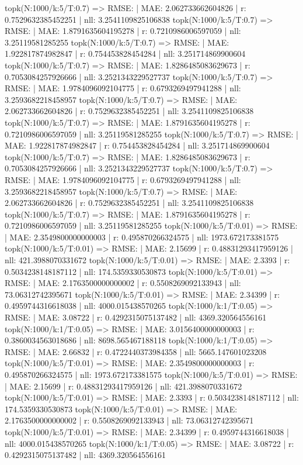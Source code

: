topk(N:1000/k:5/T:0.7) => RMSE: | MAE: 2.062733662604826 | r: 0.7529632385452251 | nll: 3.2541109825106838
topk(N:1000/k:5/T:0.7) => RMSE: | MAE: 1.8791635604195278 | r: 0.7210986006597059 | nll: 3.25119581285255
topk(N:1000/k:5/T:0.7) => RMSE: | MAE: 1.922817874982847 | r: 0.754453828454284 | nll: 3.251714869900604
topk(N:1000/k:5/T:0.7) => RMSE: | MAE: 1.8286485083629673 | r: 0.7053084257926666 | nll: 3.2521343229527737
topk(N:1000/k:5/T:0.7) => RMSE: | MAE: 1.9784096092104775 | r: 0.6793269497941288 | nll: 3.2593682218458957
topk(N:1000/k:5/T:0.7) => RMSE: | MAE: 2.062733662604826 | r: 0.7529632385452251 | nll: 3.2541109825106838
topk(N:1000/k:5/T:0.7) => RMSE: | MAE: 1.8791635604195278 | r: 0.7210986006597059 | nll: 3.25119581285255
topk(N:1000/k:5/T:0.7) => RMSE: | MAE: 1.922817874982847 | r: 0.754453828454284 | nll: 3.251714869900604
topk(N:1000/k:5/T:0.7) => RMSE: | MAE: 1.8286485083629673 | r: 0.7053084257926666 | nll: 3.2521343229527737
topk(N:1000/k:5/T:0.7) => RMSE: | MAE: 1.9784096092104775 | r: 0.6793269497941288 | nll: 3.2593682218458957
topk(N:1000/k:5/T:0.7) => RMSE: | MAE: 2.062733662604826 | r: 0.7529632385452251 | nll: 3.2541109825106838
topk(N:1000/k:5/T:0.7) => RMSE: | MAE: 1.8791635604195278 | r: 0.7210986006597059 | nll: 3.25119581285255
topk(N:1000/k:5/T:0.01) => RMSE: | MAE: 2.3549800000000003 | r: 0.495870266324575 | nll: 1973.672173381575
topk(N:1000/k:5/T:0.01) => RMSE: | MAE: 2.15699 | r: 0.48831293417959126 | nll: 421.3988070331672
topk(N:1000/k:5/T:0.01) => RMSE: | MAE: 2.3393 | r: 0.5034238148187112 | nll: 174.5359330530873
topk(N:1000/k:5/T:0.01) => RMSE: | MAE: 2.1763500000000002 | r: 0.5508269092133943 | nll: 73.06312742395671
topk(N:1000/k:5/T:0.01) => RMSE: | MAE: 2.34399 | r: 0.4959744316618038 | nll: 4000.015438570265
topk(N:1000/k:1/T:0.05) => RMSE: | MAE: 3.08722 | r: 0.4292315075137482 | nll: 4369.320564556161
topk(N:1000/k:1/T:0.05) => RMSE: | MAE: 3.0156400000000003 | r: 0.3860034563018686 | nll: 8698.565467188118
topk(N:1000/k:1/T:0.05) => RMSE: | MAE: 2.66832 | r: 0.4722440373984358 | nll: 5665.147601023208
topk(N:1000/k:5/T:0.01) => RMSE: | MAE: 2.3549800000000003 | r: 0.495870266324575 | nll: 1973.672173381575
topk(N:1000/k:5/T:0.01) => RMSE: | MAE: 2.15699 | r: 0.48831293417959126 | nll: 421.3988070331672
topk(N:1000/k:5/T:0.01) => RMSE: | MAE: 2.3393 | r: 0.5034238148187112 | nll: 174.5359330530873
topk(N:1000/k:5/T:0.01) => RMSE: | MAE: 2.1763500000000002 | r: 0.5508269092133943 | nll: 73.06312742395671
topk(N:1000/k:5/T:0.01) => RMSE: | MAE: 2.34399 | r: 0.4959744316618038 | nll: 4000.015438570265
topk(N:1000/k:1/T:0.05) => RMSE: | MAE: 3.08722 | r: 0.4292315075137482 | nll: 4369.320564556161
